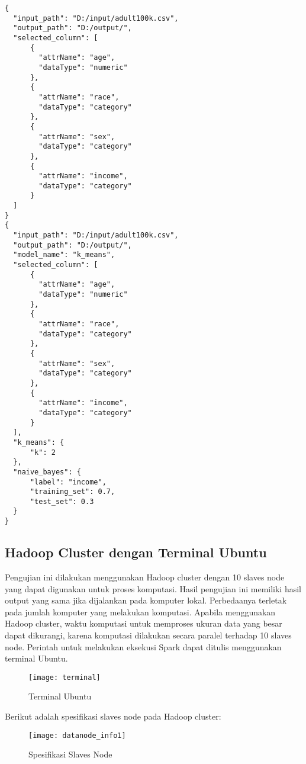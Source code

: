 \begin{lstlisting}[basicstyle=\ttfamily, frame=single,
	columns=fullflexible, keepspaces=true, breaklines=true, label=lst:pl_csv, caption=Data JSON untuk Perangkat Lunak Eksplorasi]
{
  "input_path": "D:/input/adult100k.csv",
  "output_path": "D:/output/",
  "selected_column": [
      {
        "attrName": "age",
        "dataType": "numeric"
      },
      {
        "attrName": "race",
        "dataType": "category"
      },
      {
        "attrName": "sex",
        "dataType": "category"
      },
      {
        "attrName": "income",
        "dataType": "category"
      }
  ]
}
{
  "input_path": "D:/input/adult100k.csv",
  "output_path": "D:/output/",
  "model_name": "k_means",
  "selected_column": [
      {
        "attrName": "age",
        "dataType": "numeric"
      },
      {
        "attrName": "race",
        "dataType": "category"
      },
      {
        "attrName": "sex",
        "dataType": "category"
      },
      {
        "attrName": "income",
        "dataType": "category"
      }
  ],
  "k_means": {
      "k": 2
  },
  "naive_bayes": {
      "label": "income",
      "training_set": 0.7,
      "test_set": 0.3
  }
}
\end{lstlisting}



\subsection{Hadoop Cluster dengan Terminal Ubuntu}
Pengujian ini dilakukan menggunakan Hadoop cluster dengan 10 slaves node yang dapat digunakan untuk proses komputasi. Hasil pengujian ini memiliki hasil output yang sama jika dijalankan pada komputer lokal. Perbedaanya terletak pada jumlah komputer yang melakukan komputasi. Apabila menggunakan Hadoop cluster, waktu komputasi untuk memproses ukuran data yang besar dapat dikurangi, karena komputasi dilakukan secara paralel terhadap 10 slaves node. Perintah untuk melakukan eksekusi Spark dapat ditulis menggunakan terminal Ubuntu.

\begin{figure}[H]
	\centering
	\texttt{[image: terminal]}
	\caption{Terminal Ubuntu}
	\label{fig:pertama0}
\end{figure}

\newpage
\noindent Berikut adalah spesifikasi slaves node pada Hadoop cluster:

\begin{figure}[H]
	\centering
	\texttt{[image: datanode\_info1]}
	\caption{Spesifikasi Slaves Node }
	\label{fig:pertama0}
\end{figure}

